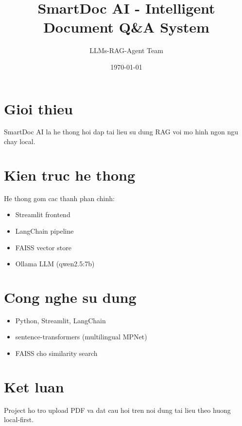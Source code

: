 \documentclass[12pt,a4paper]{article}
\title{SmartDoc AI - Intelligent Document Q\&A System}
\author{LLMs-RAG-Agent Team}
\date{\today}
\begin{document}
\maketitle

\section{Gioi thieu}
SmartDoc AI la he thong hoi dap tai lieu su dung RAG voi mo hinh ngon ngu chay local.

\section{Kien truc he thong}
He thong gom cac thanh phan chinh:
\begin{itemize}
	\item Streamlit frontend
	\item LangChain pipeline
	\item FAISS vector store
	\item Ollama LLM (qwen2.5:7b)
\end{itemize}

\section{Cong nghe su dung}
\begin{itemize}
	\item Python, Streamlit, LangChain
	\item sentence-transformers (multilingual MPNet)
	\item FAISS cho similarity search
\end{itemize}

\section{Ket luan}
Project ho tro upload PDF va dat cau hoi tren noi dung tai lieu theo huong local-first.
\end{document}
